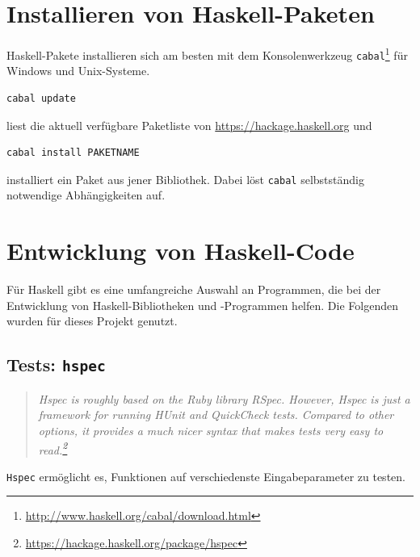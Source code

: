 \section{Installieren von Haskell-Paketen}
Haskell-Pakete installieren sich am besten mit dem Konsolenwerkzeug
\texttt{cabal}\footnote{\url{http://www.haskell.org/cabal/download.html}} für
Windows und Unix-Systeme.
\begin{lstlisting}[language=bash 
                  ,numbers=none
                  ,frame=L]
cabal update
\end{lstlisting}
liest die aktuell verfügbare Paketliste von \url{https://hackage.haskell.org}
und
\begin{lstlisting}[language=bash
                  ,numbers=none
                  ,frame=L]
cabal install PAKETNAME
\end{lstlisting}
installiert ein Paket aus jener Bibliothek.
Dabei löst \texttt{cabal} selbstständig notwendige Abhängigkeiten auf.

\section{Entwicklung von Haskell-Code}
Für Haskell gibt es eine umfangreiche Auswahl an Programmen, die bei der
Entwicklung von Haskell-Bibliotheken und -Programmen helfen. 
Die Folgenden wurden für dieses Projekt genutzt.

\subsection{Tests: \texttt{hspec}}
\begin{quote}\itshape
  Hspec is roughly based on the Ruby library RSpec. However, Hspec is just a
  framework for running HUnit and QuickCheck tests. Compared to other options,
  it provides a much nicer syntax that makes tests very easy to
  read.\footnote{\url{https://hackage.haskell.org/package/hspec}}
\end{quote}
\texttt{Hspec} ermöglicht es, Funktionen auf verschiedenste Eingabeparameter zu
testen.

